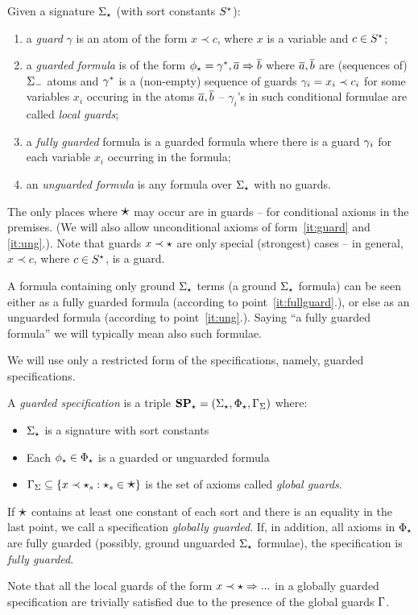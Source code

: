 \begin{definition}\label{def:guf}
Given a signature  $\Sigma_\star$ (with sort constants $S^\star$):
\begin{enumerate}\MyLPar
\item\label{it:guard} a {\em guard} $\gamma$ is an atom of the form $x \prec c$, where
$x$ is a variable and $c \in S^\star$;
\item a {\em guarded formula} is of the form $\phi_\star = \gamma^{\ast},
	\overline{a} \Rightarrow \overline{b}$ where $\overline{a},\overline{b}$ are (sequences of)
	${\Sigma_-}$ atoms and 
	$\gamma^\ast$ is a (non-empty) sequence of guards $\gamma_i =
	x_i\prec {c_{i}}$ for some variables $x_i$ occuring in the
	atoms $\overline{a},\overline{b}$ -- $\gamma_i$'s in such conditional
	formulae are called {\em local guards};
\item\label{it:fullguard} a {\em fully guarded} formula is a guarded formula where there is a
guard $\gamma_i$ for each variable $x_i$ occurring in the formula;
\item\label{it:ung} an {\em unguarded formula} is any formula over $\Sigma_\star$
with no guards.
\end{enumerate}
\end{definition}
The only places where $\mbox{\Large{$\star$}}$ may occur are in guards
-- for conditional axioms in the premises. (We will also allow unconditional
axioms of form~\ref{it:guard} and \ref{it:ung}.). Note that guards $x\prec\star$ are only special
(strongest) cases -- in general, $x\prec c$, where $c\in S^\star$, is a
guard. 

A formula containing only ground $\Sigma_\star$ terms (a ground
$\Sigma_\star$ formula) can be seen either as a fully guarded formula
(according to point~\ref{it:fullguard}.), or else as an unguarded formula
(according to point~\ref{it:ung}.). Saying ``a fully guarded formula'' we
will typically mean also such formulae.

We will use only a restricted form of the specifications, namely, 
guarded  specifications.

\begin{definition}\label{def:guardedspec}
A {\em guarded specification} is a triple ${\bf SP_\star} = (\Sigma_\star,\Phi_\star,\Gamma_{\Sigma})$ where:
\begin{itemize}\MyLPar
\item $\Sigma_\star$ is a signature with sort constants
\item Each $\phi_\star \in \Phi_\star$ is a guarded or unguarded formula
\item $\Gamma_\Sigma \subseteq \{ x \prec \star_s : \star_s \in \mbox{\Large{$\star$}} \}$ is the
set of axioms called {\em global guards}.
\end{itemize}
If $\mbox{\Large{$\star$}}$ contains at least one constant of each sort and there is an equality in the last point, 
we call a specification {\em
	globally guarded}. If, in addition, all axioms in $\Phi_\star$ are
	fully guarded (possibly, ground unguarded $\Sigma_\star$ formulae), the specification is {\em fully guarded}.
\end{definition}
Note that all the local guards of the form $x\prec\star\Rightarrow...$ in a globally
guarded specification are trivially satisfied 
due to the presence of the global guards $\Gamma$.

